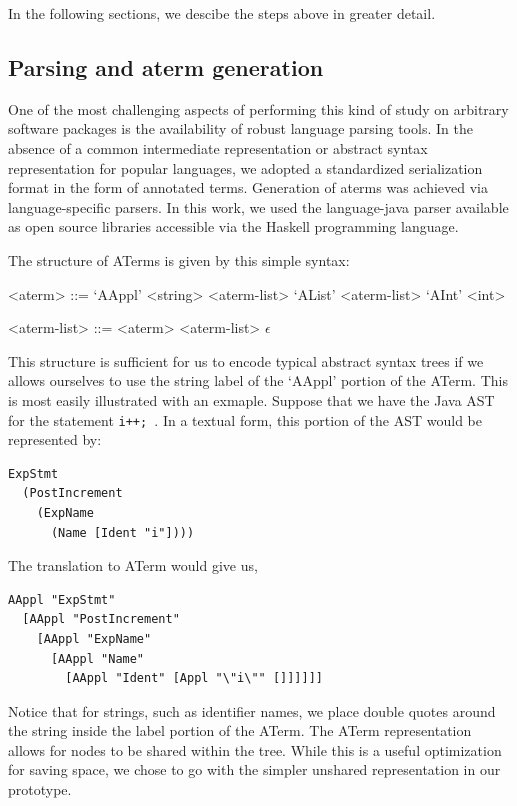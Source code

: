 In the following sections, we descibe the steps above in greater detail.

\subsection{Parsing and aterm generation}

One of the most challenging aspects of performing this kind of study on
arbitrary software packages is the availability of robust language parsing
tools.  In the absence of a common intermediate representation or abstract
syntax representation for popular languages, we adopted a standardized
serialization format in the form of annotated terms.  Generation of aterms was
achieved via language-specific parsers.  In this work, we used the
language-java parser available as open source libraries accessible via the
Haskell programming language.

The structure of ATerms is given by this simple syntax:
\setlength{\grammarindent}{8em}
\begin{grammar}
<aterm> ::= `AAppl' <string> <aterm-list>
\alt `AList' <aterm-list>
\alt `AInt' <int>

<aterm-list> ::= <aterm> <aterm-list>
\alt $\epsilon$
\end{grammar}

This structure is sufficient for us to encode typical abstract syntax trees if
we allows ourselves to use the string label of the `AAppl' portion of the
ATerm. This is most easily illustrated with an exmaple.  Suppose that we have
the Java AST for the statement {\tt i++; }.  In a textual form, this portion of
the AST would be represented by:

\begin{verbatim}
ExpStmt
  (PostIncrement
    (ExpName
      (Name [Ident "i"])))
\end{verbatim}

The translation to ATerm would give us,

\begin{verbatim}
AAppl "ExpStmt"
  [AAppl "PostIncrement"
    [AAppl "ExpName"
      [AAppl "Name"
        [AAppl "Ident" [Appl "\"i\"" []]]]]]
\end{verbatim}

Notice that for strings, such as identifier names, we place double quotes
around the string inside the label portion of the ATerm. The ATerm
representation allows for nodes to be shared within the tree. While this is a
useful optimization for saving space, we chose to go with the simpler unshared
representation in our prototype.

